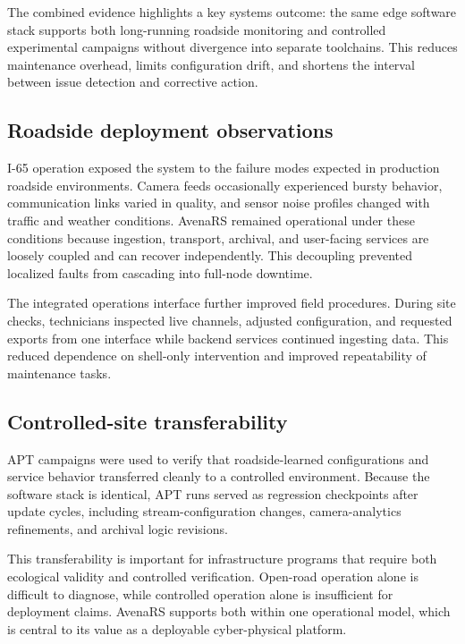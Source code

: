 \documentclass[conference]{IEEEtran}
\begin{document}
The combined evidence highlights a key systems outcome: the same edge software stack supports both long-running roadside monitoring and controlled experimental campaigns without divergence into separate toolchains. This reduces maintenance overhead, limits configuration drift, and shortens the interval between issue detection and corrective action.

\subsection{Roadside deployment observations}
I-65 operation exposed the system to the failure modes expected in production roadside environments. Camera feeds occasionally experienced bursty behavior, communication links varied in quality, and sensor noise profiles changed with traffic and weather conditions. AvenaRS remained operational under these conditions because ingestion, transport, archival, and user-facing services are loosely coupled and can recover independently. This decoupling prevented localized faults from cascading into full-node downtime.

The integrated operations interface further improved field procedures. During site checks, technicians inspected live channels, adjusted configuration, and requested exports from one interface while backend services continued ingesting data. This reduced dependence on shell-only intervention and improved repeatability of maintenance tasks.

\subsection{Controlled-site transferability}
APT campaigns were used to verify that roadside-learned configurations and service behavior transferred cleanly to a controlled environment. Because the software stack is identical, APT runs served as regression checkpoints after update cycles, including stream-configuration changes, camera-analytics refinements, and archival logic revisions.

This transferability is important for infrastructure programs that require both ecological validity and controlled verification. Open-road operation alone is difficult to diagnose, while controlled operation alone is insufficient for deployment claims. AvenaRS supports both within one operational model, which is central to its value as a deployable cyber-physical platform.
\end{document}
